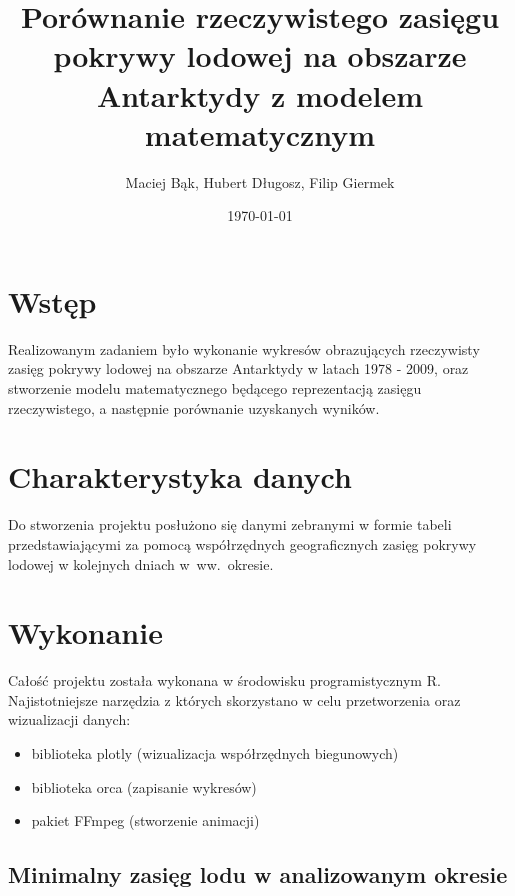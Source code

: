 \documentclass[letterpaper,12pt]{article}
\begin{document}
\pagestyle{plain}

\title{Porównanie rzeczywistego zasięgu pokrywy lodowej na obszarze Antarktydy z modelem matematycznym}
\author{Maciej Bąk, Hubert Długosz, Filip Giermek}
\date{\today}
\maketitle

\section{Wstęp}
Realizowanym zadaniem było wykonanie wykresów obrazujących rzeczywisty zasięg pokrywy lodowej na obszarze Antarktydy w latach 1978 - 2009, oraz stworzenie modelu matematycznego będącego reprezentacją zasięgu rzeczywistego, a następnie porównanie uzyskanych wyników. 

\section{Charakterystyka danych}
Do stworzenia projektu posłużono się danymi zebranymi w formie tabeli przedstawiającymi za pomocą współrzędnych geograficznych zasięg pokrywy lodowej w kolejnych dniach w~ww.~okresie.

\section{Wykonanie}
Całość projektu została wykonana w środowisku programistycznym R. Najistotniejsze narzędzia z których skorzystano w celu przetworzenia oraz wizualizacji danych:

\begin{itemize}
  \item biblioteka plotly (wizualizacja współrzędnych biegunowych)
  \item biblioteka orca (zapisanie wykresów)
  \item pakiet FFmpeg (stworzenie animacji)
\end{itemize}

\subsection{Minimalny zasięg lodu w analizowanym okresie}
\end{document}
